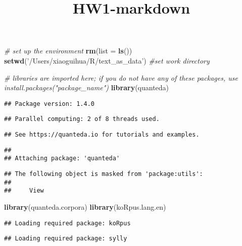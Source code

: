 \documentclass[]{article}
\title{HW1-markdown}
\author{}
\date{}
\newenvironment{Shaded}{\begin{snugshade}}{\end{snugshade}}
\newcommand{\KeywordTok}[1]{\textcolor[rgb]{0.13,0.29,0.53}{\textbf{#1}}}
\newcommand{\DataTypeTok}[1]{\textcolor[rgb]{0.13,0.29,0.53}{#1}}
\newcommand{\StringTok}[1]{\textcolor[rgb]{0.31,0.60,0.02}{#1}}
\newcommand{\CommentTok}[1]{\textcolor[rgb]{0.56,0.35,0.01}{\textit{#1}}}
\newcommand{\NormalTok}[1]{#1}
\begin{document}
\maketitle

\begin{Shaded}
\begin{Highlighting}[]
\CommentTok{# set up the environment}
\KeywordTok{rm}\NormalTok{(}\DataTypeTok{list =} \KeywordTok{ls}\NormalTok{())}
\KeywordTok{setwd}\NormalTok{(}\StringTok{'/Users/xiaoguihua/R/text_as_data'}\NormalTok{) }\CommentTok{#set work directory}

\CommentTok{# libraries are imported here; if you do not have any of these packages, use install.packages("package_name")}
\KeywordTok{library}\NormalTok{(quanteda)}
\end{Highlighting}
\end{Shaded}

\begin{verbatim}
## Package version: 1.4.0
\end{verbatim}

\begin{verbatim}
## Parallel computing: 2 of 8 threads used.
\end{verbatim}

\begin{verbatim}
## See https://quanteda.io for tutorials and examples.
\end{verbatim}

\begin{verbatim}
## 
## Attaching package: 'quanteda'
\end{verbatim}

\begin{verbatim}
## The following object is masked from 'package:utils':
## 
##     View
\end{verbatim}

\begin{Shaded}
\begin{Highlighting}[]
\KeywordTok{library}\NormalTok{(quanteda.corpora)}
\KeywordTok{library}\NormalTok{(koRpus.lang.en)}
\end{Highlighting}
\end{Shaded}

\begin{verbatim}
## Loading required package: koRpus
\end{verbatim}

\begin{verbatim}
## Loading required package: sylly
\end{verbatim}
\end{document}
